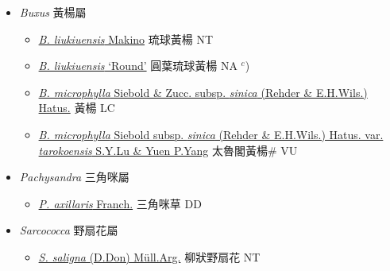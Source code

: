
  \begin{itemize}
 \item[] \textit{Buxus} 黃楊屬
                    
  \begin{itemize}
        \item[] \href{http://www.theplantlist.org/tpl1.1/search?q=Buxus+liukiuensis}{\textit{B. liukiuensis} Makino}   琉球黃楊 NT
        \item[] \href{http://www.theplantlist.org/tpl1.1/search?q=Buxus+liukiuensis}{\textit{B. liukiuensis} ‘Round’}   圓葉琉球黃楊 NA $^c$)
        \item[] \href{http://www.theplantlist.org/tpl1.1/search?q=Buxus+microphylla+subsp.+sinica}{\textit{B. microphylla} Siebold \& Zucc. subsp. \textit{sinica} (Rehder \& E.H.Wils.) Hatus.}   黃楊 LC
        \item[] \href{http://www.theplantlist.org/tpl1.1/search?q=Buxus+microphylla+subsp.+sinica+var.+tarokoensis}{\textit{B. microphylla} Siebold subsp. \textit{sinica} (Rehder \& E.H.Wils.) Hatus. var. \textit{tarokoensis} S.Y.Lu \& Yuen P.Yang}   太魯閣黃楊\# VU
  \end{itemize}
 \item[] \textit{Pachysandra} 三角咪屬
                    
  \begin{itemize}
        \item[] \href{http://www.theplantlist.org/tpl1.1/search?q=Pachysandra+axillaris}{\textit{P. axillaris} Franch.}   三角咪草 DD
  \end{itemize}
 \item[] \textit{Sarcococca} 野扇花屬
                    
  \begin{itemize}
        \item[] \href{http://www.theplantlist.org/tpl1.1/search?q=Sarcococca+saligna}{\textit{S. saligna} (D.Don) Müll.Arg.}   柳狀野扇花 NT
  \end{itemize}
  \end{itemize}
